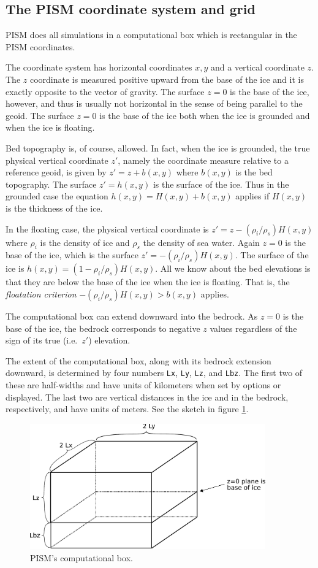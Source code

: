 \documentclass[11pt,final]{amsart}
\renewcommand{\t}[1]{\texttt{#1}}
\begin{document}
\subsection{The PISM coordinate system and grid} \label{subsect:coords} PISM does all simulations in a computational box which is rectangular in the PISM coordinates.

The coordinate system has horizontal coordinates $x,y$ and a vertical coordinate $z$.  The $z$ coordinate is measured positive upward from the base of the ice and it is exactly opposite to the vector of gravity.  The surface $z=0$ is the base of the ice, however, and thus is usually not horizontal in the sense of being parallel to the geoid.   The surface $z=0$ is the base of the ice both when the ice is grounded and when the ice is floating.

Bed topography is, of course, allowed.  In fact, when the ice is grounded, the true physical vertical coordinate $z'$, namely the coordinate measure relative to a reference geoid, is given by $z'=z+b(x,y)$ where $b(x,y)$ is the bed topography.  The surface $z'=h(x,y)$ is the surface of the ice.  Thus in the grounded case the equation $h(x,y)=H(x,y)+b(x,y)$ applies if $H(x,y)$ is the thickness of the ice.

In the floating case, the physical vertical coordinate is $z'=z-(\rho_i/\rho_s) H(x,y)$ where $\rho_i$ is the density of ice and $\rho_s$ the density of sea water.  Again $z=0$ is the base of the ice, which is the surface $z' = -(\rho_i/\rho_s) H(x,y)$.  The surface of the ice is $h(x,y) = (1-\rho_i/\rho_s) H(x,y)$.  All we know about the bed elevations is that they are below the base of the ice when the ice is floating.  That is, the \emph{floatation criterion} $-(\rho_i/\rho_s) H(x,y) > b(x,y)$ applies.

The computational box can extend downward into the bedrock.  As $z=0$ is the base of the ice, the bedrock corresponds to negative $z$ values regardless of the sign of its true (i.e.~$z'$) elevation.

The extent of the computational box, along with its bedrock extension downward, is determined by four numbers \t{Lx}, \t{Ly}, \t{Lz}, and \t{Lbz}.  The first two of these are half-widths and have units of kilometers when set by options or displayed.  The last two are vertical distances in the ice and in the bedrock, respectively, and have units of meters.  See the sketch in figure \ref{fig:rectilinearbox}.

\begin{figure}[ht]
\includegraphics[width=4.0in,keepaspectratio=true]{figs/rectilinearbox}
\caption{PISM's computational box.}
\label{fig:rectilinearbox}
\end{figure}
\end{document}
